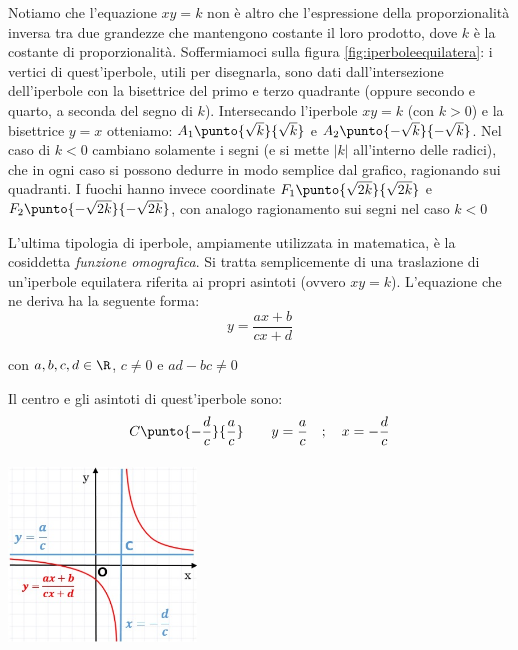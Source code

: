 Notiamo che l'equazione $xy=k$ non è altro che l'espressione della 
proporzionalità inversa tra due grandezze che mantengono costante il loro 
prodotto, dove $k$ è la costante di proporzionalità. Soffermiamoci sulla 
figura \ref{fig:iperboleequilatera}: i vertici di quest'iperbole, utili per disegnarla, sono dati 
dall'intersezione dell'iperbole con la bisettrice del primo e terzo 
quadrante (oppure secondo e quarto, a seconda del segno di $k$). Intersecando l'iperbole $xy=k$ (con $k>0$)
e la bisettrice $y=x$ otteniamo: $A_{1} \punto{\sqrt{k}}{\sqrt{k}}$ e 
$A_{2} \punto{- \sqrt{k}}{-\sqrt{k}}$. Nel caso di $k<0$ cambiano solamente i segni (e si mette $|k|$ all'interno delle radici), che in ogni caso
si possono dedurre in modo semplice dal grafico, ragionando sui quadranti. I fuochi hanno invece coordinate
$F_1 \punto{\sqrt{2k}}{\sqrt{2k}}$ e $F_2 \punto{-\sqrt{2k}}{-\sqrt{2k}}$, con analogo ragionamento sui segni
nel caso $k<0$

\vspace{12pt}

\noindent\begin{minipage}{.6\textwidth}
L'ultima tipologia di iperbole, ampiamente utilizzata in matematica,
è la cosiddetta \emph{funzione omografica}. Si tratta semplicemente di
una traslazione di un'iperbole equilatera riferita ai propri asintoti (ovvero $xy=k$).
L'equazione che ne deriva ha la seguente forma:
\begin{equation}
y= \dfrac{ax+b}{cx+d}
\end{equation}

con $a,b,c,d\in \R$, $c \neq 0$ e $ ad-bc \neq 0$

\vspace{6pt}
Il centro e gli asintoti di quest'iperbole sono:
\[C \punto{-\dfrac{d}{c}}{\dfrac{a}{c}} \qquad y= \dfrac{a}{c} \quad; \quad  x=-\dfrac{d}{c}\]
\end{minipage}
\hfill
\begin{minipage}{.35\textwidth}
  \centering
  \includegraphics[height=5cm, width=5cm]{img/omografica.jpg}
\end{minipage}

